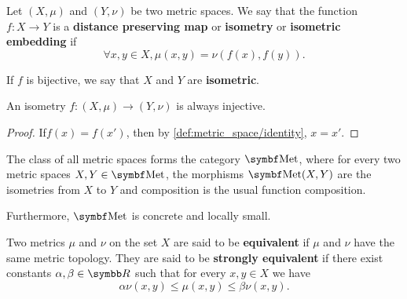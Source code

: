 \begin{definition}\label{def:isometry}\cite[253]{Engelking1989}
  Let \( (X, \mu) \) and \( (Y, \nu) \) be two metric spaces. We say that the function \( f: X \to Y \) is a \textbf{distance preserving map} or \textbf{isometry} or \textbf{isometric embedding} if
  \begin{equation*}
    \forall x, y \in X, \mu(x, y) = \nu(f(x), f(y)).
  \end{equation*}

  If \( f \) is bijective, we say that \( X \) and \( Y \) are \textbf{isometric}.
\end{definition}

\begin{proposition}\label{def:isometry_is_injective}
  An isometry \( f: (X, \mu) \to (Y, \nu) \) is always injective.
\end{proposition}
\begin{proof}
  If\LEM \( f(x) = f(x') \), then by \ref{def:metric_space/identity}, \( x = x' \).
\end{proof}

\begin{definition}\label{def:category_of_metric_spaces}
  The class of all metric spaces forms the category \( \Bold{Met} \), where for every two metric spaces \( X, Y \in \Bold{Met} \), the morphisms \( \Bold{Met}(X, Y) \) are the isometries from \( X \) to \( Y \) and composition is the usual function composition.

  Furthermore, \( \Bold{Met} \) is concrete and locally small.
\end{definition}

\begin{definition}\label{def:equivalent_metrics}
  Two metrics \( \mu \) and \( \nu \) on the set \( X \) are said to be \textbf{equivalent} if \( \mu \) and \( \nu \) have the same metric topology. They are said to be \textbf{strongly equivalent} if there exist constants \( \alpha, \beta \in \BB{R} \) such that for every \( x, y \in X \) we have
  \begin{equation*}
    \alpha \nu(x, y) \leq \mu(x, y) \leq \beta \nu(x, y).
  \end{equation*}
\end{definition}

